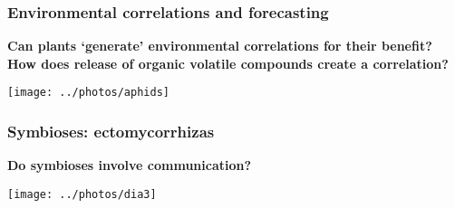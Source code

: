 \begin{frame}
\frametitle{Environmental correlations and forecasting \Discussion}

\textbf{Can plants `generate' environmental correlations for their benefit?\\
How does release of organic volatile compounds create a correlation?}

    \centering
    \texttt{[image: ../photos/aphids]}
\end{frame}

\begin{frame}
\frametitle{Symbioses: ectomycorrhizas \Discussion}

\textbf{Do symbioses involve communication?}

    \centering
    \texttt{[image: ../photos/dia3]}
\end{frame}



